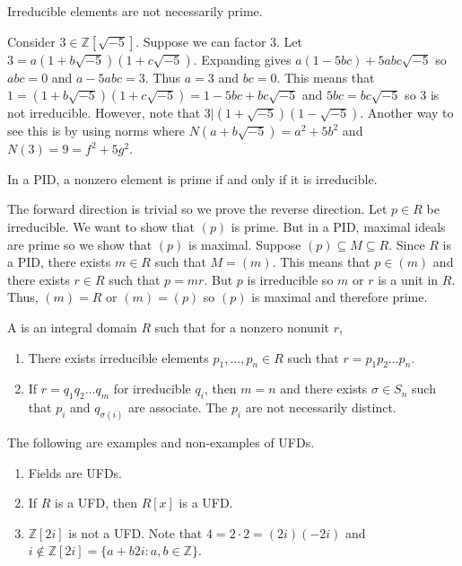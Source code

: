 \documentclass{mathnotes}
\begin{document}
\begin{note}
  Irreducible elements are not necessarily prime.
\end{note}

\begin{ex}
  Consider $3\in\mathbb{Z}[\sqrt{-5}]$. Suppose we can factor 3. Let
  $3=a(1+b\sqrt{-5})(1+c\sqrt{-5})$. Expanding gives $a(1-5bc)+5abc\sqrt{-5}$
  so $abc=0$ and $a-5abc=3$. Thus $a=3$ and $bc=0$. This means that
  $1=(1+b\sqrt{-5})(1+c\sqrt{-5})=1-5bc+bc\sqrt{-5}$ and $5bc=bc\sqrt{-5}$ so 3
  is not irreducible. However, note that $3|(1+\sqrt{-5})(1-\sqrt{-5})$.
  Another way to see this is by using norms where $N(a+b\sqrt{-5})=a^2+5b^2$
  and $N(3)=9=f^2+5g^2$.
\end{ex}

\begin{prop}
  In a PID, a nonzero element is prime if and only if it is irreducible.
\end{prop}

\begin{pf}
  The forward direction is trivial so we prove the reverse direction. Let $p\in
  R$ be irreducible. We want to show that $(p)$ is prime. But in a PID, maximal
  ideals are prime so we show that $(p)$ is maximal. Suppose $(p)\subseteq
  M\subseteq R$. Since $R$ is a PID, there exists $m\in R$ such that $M=(m)$.
  This means that $p\in(m)$ and there exists $r\in R$ such that $p=mr$. But $p$
  is irreducible so $m$ or $r$ is a unit in $R$. Thus, $(m)=R$ or $(m)=(p)$ so
  $(p)$ is maximal and therefore prime.
\end{pf}

\begin{defi}
  A  is an integral domain $R$ such that
  for a nonzero nonunit $r$,
  \begin{enumerate}
    \item There exists irreducible elements $p_1,\ldots,p_n\in R$ such that
      $r=p_1p_2\ldots p_n$.
    \item If $r=q_1q_2\ldots q_m$ for irreducible $q_i$, then $m=n$ and there
      exists $\sigma\in S_n$ such that $p_i$ and $q_{\sigma(i)}$ are associate.
      The $p_i$ are not necessarily distinct.
  \end{enumerate}
\end{defi}

\begin{ex}
  The following are examples and non-examples of UFDs.
  \begin{enumerate}
    \item Fields are UFDs.
    \item If $R$ is a UFD, then $R[x]$ is a UFD.
    \item $\mathbb{Z}[2i]$ is not a UFD. Note that $4=2\cdot2=(2i)(-2i)$ and
      $i\notin\mathbb{Z}[2i]=\{a+b2i:a,b\in\mathbb{Z}\}$.
  \end{enumerate}
\end{ex}
\end{document}
